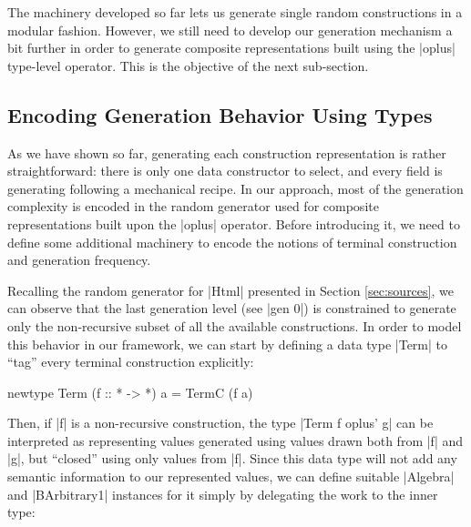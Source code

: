 %
%
The machinery developed so far lets us generate single random constructions in a
modular fashion.
%
However, we still need to develop our generation mechanism a bit further in
order to generate composite representations built using the |oplus| type-level
operator.
%
This is the objective of the next sub-section.

%
\subsection{Encoding Generation Behavior Using Types}

As we have shown so far, generating each construction representation is rather
straightforward: there is only one data constructor to select, and every field
is generating following a mechanical recipe.
%
In our approach, most of the generation complexity is encoded in the random
generator used for composite representations built upon the |oplus| operator.
%
Before introducing it, we need to define some additional machinery to encode the
notions of terminal construction and generation frequency.


Recalling the random generator for |Html| presented in Section
\ref{sec:sources}, we can observe that the last generation level (see |gen 0|)
is constrained to generate only the non-recursive subset of all the available
constructions.
%
In order to model this behavior in our framework, we can start by defining a
data type |Term| to ``tag'' every terminal construction explicitly:

\begin{code}
newtype Term (f :: * -> *) a = TermC (f a)
\end{code}

Then, if |f| is a non-recursive construction, the type |Term f oplus' g| can be
interpreted as representing values generated using values drawn both from |f|
and |g|, but ``closed'' using only values from |f|.
%
Since this data type will not add any semantic information to our represented
values, we can define suitable |Algebra| and |BArbitrary1| instances for it
simply by delegating the work to the inner type:



